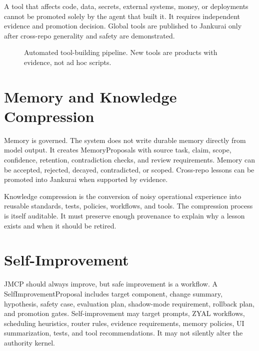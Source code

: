 \documentclass[12pt,journal,onecolumn,draftclsnofoot]{IEEEtran}
\begin{document}
A tool that affects code, data, secrets, external systems, money, or deployments cannot be promoted solely by the agent that built it. It requires independent evidence and promotion decision. Global tools are published to Jankurai only after cross-repo generality and safety are demonstrated.

\begin{figure}[!ht]
\centering
{}
\caption{Automated tool-building pipeline. New tools are products with evidence, not ad hoc scripts.}
\label{fig:toolbuild}
\end{figure}

\section{Memory and Knowledge Compression}
Memory is governed. The system does not write durable memory directly from model output. It creates MemoryProposals with source task, claim, scope, confidence, retention, contradiction checks, and review requirements. Memory can be accepted, rejected, decayed, contradicted, or scoped. Cross-repo lessons can be promoted into Jankurai when supported by evidence.

Knowledge compression is the conversion of noisy operational experience into reusable standards, tests, policies, workflows, and tools. The compression process is itself auditable. It must preserve enough provenance to explain why a lesson exists and when it should be retired.

\section{Self-Improvement}
JMCP should always improve, but safe improvement is a workflow. A SelfImprovementProposal includes target component, change summary, hypothesis, safety case, evaluation plan, shadow-mode requirement, rollback plan, and promotion gates. Self-improvement may target prompts, ZYAL workflows, scheduling heuristics, router rules, evidence requirements, memory policies, UI summarization, tests, and tool recommendations. It may not silently alter the authority kernel.
\end{document}
